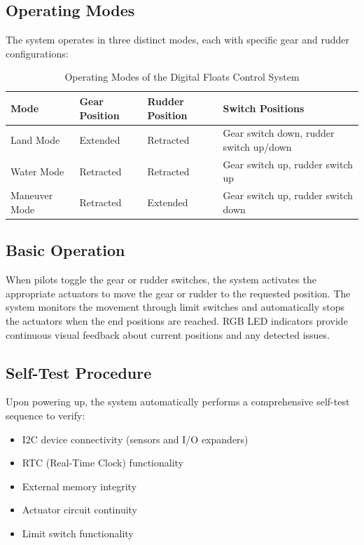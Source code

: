 \documentclass[12pt,a4paper,twoside,openright]{book}
\newcommand{\tabletextfont}{\normalfont\rmfamily}
\newcommand{\tableheadfont}{\normalfont\bfseries}
\begin{document}
\subsection{Operating Modes}
The system operates in three distinct modes, each with specific gear and rudder configurations:

\begin{table}[h]
\centering
\setlength{\tabcolsep}{4pt} %
\begin{tabular}{|p{}|p{}|p{}|p{}|}
\hline
\tableheadfont\textbf{Mode} & \tableheadfont\textbf{Gear Position} & \tableheadfont\textbf{Rudder Position} & \tableheadfont\textbf{Switch Positions} \\
\hline
\tabletextfont Land Mode & Extended & Retracted & Gear switch down, rudder switch up/down \\
\hline
\tabletextfont Water Mode & Retracted & Retracted & Gear switch up, rudder switch up \\
\hline
\tabletextfont Maneuver Mode & Retracted & Extended & Gear switch up, rudder switch down \\
\hline
\end{tabular}
\caption{Operating Modes of the Digital Floats Control System}
\end{table}

\subsection{Basic Operation}
When pilots toggle the gear or rudder switches, the system activates the appropriate actuators to move the gear or rudder to the requested position. The system monitors the movement through limit switches and automatically stops the actuators when the end positions are reached. RGB LED indicators provide continuous visual feedback about current positions and any detected issues.

\subsection{Self-Test Procedure}
Upon powering up, the system automatically performs a comprehensive self-test sequence to verify:
\begin{itemize}
    \item I2C device connectivity (sensors and I/O expanders)
    \item RTC (Real-Time Clock) functionality
    \item External memory integrity
    \item Actuator circuit continuity
    \item Limit switch functionality
\end{itemize}
\end{document}
